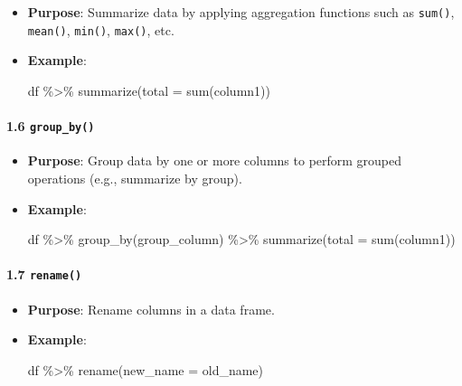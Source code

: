 \documentclass[
  letterpaper,
  DIV=11,
  numbers=noendperiod]{scrartcl}
\let\oldparagraph\paragraph
\renewcommand{\paragraph}[1]{\oldparagraph{#1}\mbox{}}
\newenvironment{Shaded}{\begin{snugshade}}{\end{snugshade}}
\newcommand{\AttributeTok}[1]{\textcolor[rgb]{0.40,0.45,0.13}{#1}}
\newcommand{\FunctionTok}[1]{\textcolor[rgb]{0.28,0.35,0.67}{#1}}
\newcommand{\NormalTok}[1]{\textcolor[rgb]{0.00,0.23,0.31}{#1}}
\newcommand{\SpecialCharTok}[1]{\textcolor[rgb]{0.37,0.37,0.37}{#1}}
\begin{document}
\begin{itemize}
\item
  \textbf{Purpose}: Summarize data by applying aggregation functions
  such as \texttt{sum()}, \texttt{mean()}, \texttt{min()},
  \texttt{max()}, etc.
\item
  \textbf{Example}:

\begin{Shaded}
\begin{Highlighting}[]
\NormalTok{df }\SpecialCharTok{\%\textgreater{}\%} \FunctionTok{summarize}\NormalTok{(}\AttributeTok{total =} \FunctionTok{sum}\NormalTok{(column1))}
\end{Highlighting}
\end{Shaded}
\end{itemize}

\paragraph{\texorpdfstring{\textbf{1.6
\texttt{group\_by()}}}{1.6 group\_by()}}\label{group_by}

\begin{itemize}
\item
  \textbf{Purpose}: Group data by one or more columns to perform grouped
  operations (e.g., summarize by group).
\item
  \textbf{Example}:

\begin{Shaded}
\begin{Highlighting}[]
\NormalTok{df }\SpecialCharTok{\%\textgreater{}\%} \FunctionTok{group\_by}\NormalTok{(group\_column) }\SpecialCharTok{\%\textgreater{}\%} \FunctionTok{summarize}\NormalTok{(}\AttributeTok{total =} \FunctionTok{sum}\NormalTok{(column1))}
\end{Highlighting}
\end{Shaded}
\end{itemize}

\paragraph{\texorpdfstring{\textbf{1.7
\texttt{rename()}}}{1.7 rename()}}\label{rename}

\begin{itemize}
\item
  \textbf{Purpose}: Rename columns in a data frame.
\item
  \textbf{Example}:

\begin{Shaded}
\begin{Highlighting}[]
\NormalTok{df }\SpecialCharTok{\%\textgreater{}\%} \FunctionTok{rename}\NormalTok{(}\AttributeTok{new\_name =}\NormalTok{ old\_name)}
\end{Highlighting}
\end{Shaded}
\end{itemize}
\end{document}
